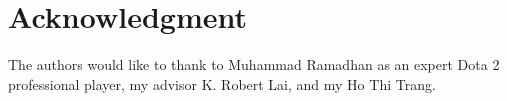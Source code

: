 \section{Acknowledgment}
\label{sec:acknowledgment}

The authors would like to thank to Muhammad Ramadhan as an expert Dota 2 professional player, my advisor K. Robert Lai, and my Ho Thi Trang.